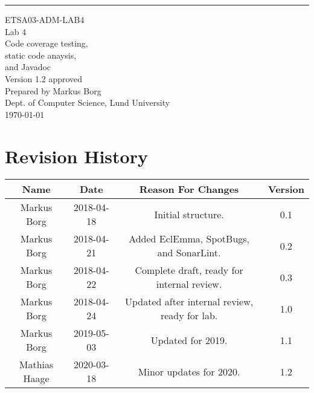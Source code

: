 \documentclass{scrreprt}
\date{}
\def\myversion{1.2 }
\begin{document}
\begin{flushright}
    \rule{16cm}{5pt}\vskip1cm
    \begin{bfseries}
    	\LARGE{ETSA03-ADM-LAB4}\\
    	\vspace{1.5cm}
        \Huge{Lab 4}\\
        \vspace{0.5cm}
        Code coverage testing,\\
        \vspace{0.5cm}
        static code anaysis,\\
        \vspace{0.5cm}
        and Javadoc\\
        \vspace{1.5cm}
        \LARGE{Version \myversion approved}\\
        \vspace{1.5cm}
        Prepared by Markus Borg\\
        Dept. of Computer Science, Lund University\\
        \vspace{1.5cm}
        \today\\
    \end{bfseries}
\end{flushright}


\chapter*{Revision History}

\begin{center}
    \begin{tabular}{|c|c|c|c|}
        \hline
	    Name & Date & Reason For Changes & Version\\
        \hline
	    Markus Borg & 2018-04-18 & Initial structure. & 0.1\\
        \hline
        Markus Borg & 2018-04-21 & Added EclEmma, SpotBugs, and SonarLint. & 0.2\\
        \hline
        Markus Borg & 2018-04-22 & Complete draft, ready for internal review. & 0.3\\
        \hline
        Markus Borg & 2018-04-24 & Updated after internal review, ready for lab. & 1.0\\
        \hline
        Markus Borg & 2019-05-03 & Updated for 2019. & 1.1\\
        \hline
        Mathias Haage & 2020-03-18 & Minor updates for 2020. & 1.2\\
        \hline
    \end{tabular}
\end{center}
\end{document}
